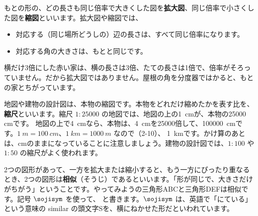もとの形の、どの長さも同じ倍率で大きくした図を\textbf{拡大図}、同じ倍率で小さくした図を\textbf{縮図}といいます。拡大図や縮図では、
\begin{itemize}[leftmargin=1.2\zw, itemsep=2pt, topsep=2pt, label={\color{\bkTT}●}]
\item 対応する（同じ場所どうしの）辺の長さは、すべて同じ倍率になります。
\item 対応する角の大きさは、もとと同じです。
\end{itemize}
横だけ3倍にした赤い家は、横の長さは3倍、たての長さは1倍で、倍率がそろっていません。だから拡大図ではありません。屋根の角を分度器ではかると、もとの家とちがっています。

地図や建物の設計図は、本物の縮図です。本物をどれだけ縮めたかを表す比を、\textbf{縮尺}といいます。縮尺 $1:\num{25000}$ の地図では、地図の上の\qty{1}{cm}が、本物の\num{25000}\,cmです。
地図の上で\qty{4}{cm}なら、本物は、\qty{4}{cm}を\num{25000}倍して、\qty{100000}{cm}です。$\qty{1}{m}=\qty{100}{cm}$、$\qty{1}{km}=\qty{1000}{m}$ なので（2-10）、
\qty{1}{km}です。かけ算のあとは、cmのままになっていることに注意しましょう。建物の設計図では、$1:100$ や $1:50$ の縮尺がよく使われます。


\leavevmode\label{bk:4-3:souji}2つの図形があって、一方を拡大または縮小すると、もう一方にぴったり重なるとき、2つの図形は\textbf{相似}（そうじ）であるといいます。「形が同じで、大きさだけがちがう」ということです。やってみようの三角形ABCと三角形DEFは相似です。記号 $\sojisym$ を使って、
と書きます。$\sojisym$ は、英語で「にている」という意味の similar の頭文字Sを、横にねかせた形だといわれています。


